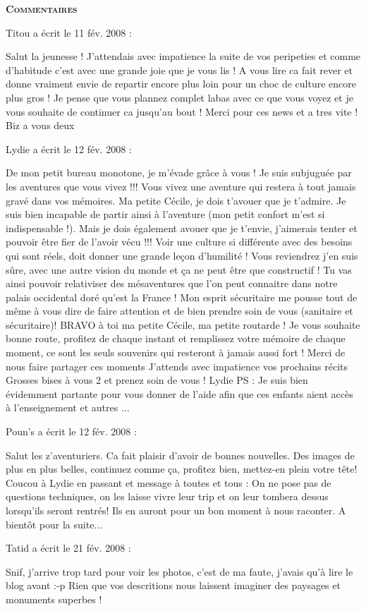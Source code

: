 \bigskip
\textbf{\textsc{Commentaires}}

 \medskip
Titou a écrit le 11 fév. 2008 :
\begin{displayquote}
Salut la jeunesse ! J'attendais avec impatience la suite de vos peripeties et comme d'habitude c'est avec une grande joie que je vous lis ! A vous lire ca fait rever et donne vraiment envie de repartir encore plus loin pour un choc de culture encore plus gros ! Je pense que vous plannez complet labas avec ce que vous voyez et je vous souhaite de continuer ca jusqu'au bout ! Merci pour ces news et a tres vite ! Biz a vous deux
\end{displayquote}

 \medskip
Lydie a écrit le 12 fév. 2008 :
\begin{displayquote}
De mon petit bureau monotone, je m'évade grâce à vous !	
Je suis subjuguée par les aventures que vous vivez !!!
Vous vivez une aventure qui restera à tout jamais gravé dans vos mémoires.
Ma petite Cécile, je dois t'avouer que je t'admire. Je suis bien incapable de partir ainsi à l'aventure (mon petit confort m'est si indispensable !).
Mais je dois également avouer que je t'envie, j'aimerais tenter et pouvoir être fier de l'avoir vécu !!!
Voir une culture si différente avec des besoins qui sont réels, doit donner une grande leçon d'humilité !
Vous reviendrez j'en suis sûre, avec une autre vision du monde et ça ne peut être que constructif !
Tu vas ainsi pouvoir relativiser des mésaventures que l'on peut connaitre dans notre palais occidental doré qu'est la France !
Mon esprit sécuritaire me pousse tout de même à vous dire de faire attention et de bien prendre soin de vous (sanitaire et sécuritaire)!
BRAVO à toi ma petite Cécile, ma petite routarde !
Je vous souhaite bonne route, profitez de chaque instant et remplissez votre mémoire de chaque moment, ce sont les seuls souvenirs qui resteront à jamais aussi fort !
Merci de nous faire partager ces moments
J'attends avec impatience vos prochains récits
Grosses bises à vous 2 et prenez soin de vous !
Lydie
PS : Je suis bien évidemment partante pour vous donner de l'aide afin que ces enfants aient accès à l'enseignement et autres ...
\end{displayquote}

 \medskip
Poun's a écrit le 12 fév. 2008 :
\begin{displayquote}
Salut les z'aventuriers. Ca fait plaisir d'avoir de bonnes nouvelles. Des images de plus en plus belles, continuez comme ça, profitez bien, mettez-en plein votre tête!
Coucou à Lydie en passant et message à toutes et tous :
On ne pose pas de questions techniques, on les laisse vivre leur trip et on leur tombera dessus lorsqu'ils seront rentrés! Ils en auront pour un bon moment à nous raconter.
A bientôt pour la suite...
\end{displayquote}

 \medskip
Tatid a écrit le 21 fév. 2008 :
\begin{displayquote}
Snif, j'arrive trop tard pour voir les photos, c'est de ma faute, j'avais qu'à lire le blog avant :-p
Rien que vos descritions nous laissent imaginer des paysages et monuments superbes !
\end{displayquote}

